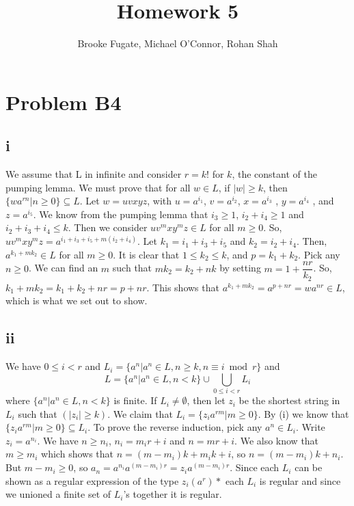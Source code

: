 \documentclass[12pt]{article}
\begin{document}
\pagestyle{plain}
\titleformat{\subsection}[runin]
  {\normalfont\large\bfseries}{\thesubsection}{1em}{}

\title{Homework 5}
\author{Brooke Fugate, Michael O'Connor, Rohan Shah}
\date{}

\maketitle

\section*{Problem B4}
\subsection*{i}
We assume that L in infinite and consider $r = k!$ for $k$, the constant of the pumping lemma. We must prove that for all $w \in L$, if $|w| \ge k$, then $\{wa^{rn} | n \ge 0 \} \subseteq L$. \newline 
Let $w=uvxyz$, with $u=a^{i_1}$, $v=a^{i_2}$, $x=a^{i_3}$ , $y=a^{i_4}$ , and $z=a^{i_5}$. We know from the pumping lemma that $i_3 \ge 1$, $i_2 + i_4 \ge 1$ and $i_2 + i_3 + i_4 \le k$. Then we consider $uv^mxy^mz \in L$ for all $m \ge 0$.  So, $uv^mxy^mz = a^{i_1+i_3+i_5 + m(i_2 + i_4)}$. Let $k_1 = i_1 + i_3 + i_5$ and $k_2 = i_2 + i_4$. Then, $a^{k_1 + mk_2} \in L$ for all $m \ge 0$. It is clear that $1 \le k_2 \le k$, and $p=k_1+k_2$. Pick any $n \ge 0$. We can find an $m$ such that $mk_2=k_2 +nk$ by setting $m=1+ \dfrac{nr}{k_2}$. So, $k_1+mk_2=k_1+k_2+nr=p+nr$. This shows that $a^{k_1+mk_2}=a^{p+nr}=wa^{nr} \in L$, which is what we set out to show. 
\subsection*{ii}
We have $0 \le i < r$ and $L_i = \{a^n |a^n \in L, n \ge k , n \equiv i \bmod r \}$ and 
$$L = \{ a^n | a^n \in L , n < k\} \cup \bigcup_{0 \le i < r} L_i$$ where $\{ a^n | a^n \in L , n < k\}$ is finite. If $L_i \neq \emptyset$, then let $z_i$ be the shortest string in $L_i$ such that $(|z_i| \ge k)$. We claim that $L_i = \{z_i a^{rm} | m \ge 0\}$. By (i) we know that $\{z_i a^{rm} | m \ge 0\} \subseteq L_i$. To prove the reverse induction, pick any $a^n \in L_i$. Write $z_i = a^{n_i}$. We have $n \ge n_i$, $n_i = m_ir + i$ and $n=mr +i$. We also know that $m \ge m_i$ which shows that $n=(m-m_i)k + m_ik + i$, so $n=(m-m_i)k + n_i$. But $m-m_i \ge 0$, so $a_n=a^{n_i}a^{(m-m_i)r}=z_ia^{(m-m_i)r}$.  Since each $L_i$ can be shown as a regular expression of the type $z_i(a^r)*$ each $L_i$ is regular and since we unioned a finite set of $L_i$'s together it is regular.
\end{document}
